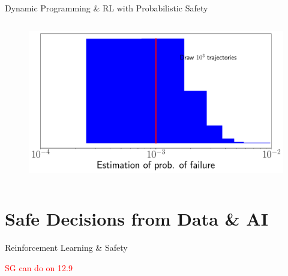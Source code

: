 \documentclass[lecture]{beamer}
\begin{document}
\begin{frame}{\normalsize Dynamic Programming \& RL with Probabilistic Safety}
\begin{columns}[t]
\begin{overlayarea}{\textwidth}{0.6\textheight}
\begin{figure}
{	\includegraphics[width=1\textwidth,clip]{Codes/BasicsSafety/SafetyEstimation3_3.pdf}
	}
	\end{figure}
\end{overlayarea}

\end{columns}

\end{frame}

\section{Safe Decisions from Data \& AI}


\begin{frame}{\normalsize Reinforcement Learning \& Safety}
\footnotesize

\textcolor{red}{SG can do on 12.9}
\end{frame}
\end{document}
